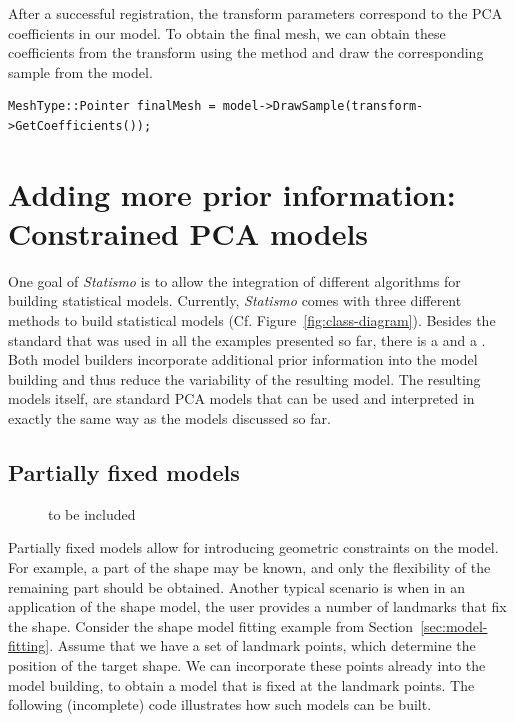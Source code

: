 \documentclass{InsightArticle}
\newcommand{\Statismo}{\emph{Statismo}\xspace}
\begin{document}
After a successful registration, the transform parameters correspond to the PCA coefficients in our model. 
To obtain the final mesh, we can obtain these coefficients from the transform using the method  
and draw the corresponding sample from the model. 
\begin{verbatim}
MeshType::Pointer finalMesh = model->DrawSample(transform->GetCoefficients());
\end{verbatim}


\section{Adding more prior information: Constrained PCA models }
One goal of \Statismo is to allow the integration of  different algorithms for building statistical models.
Currently, \Statismo comes with three different methods to build statistical models (Cf. Figure~\ref{fig:class-diagram}). Besides the standard  that was used in all the examples presented so far, there is a  \cite{luthi_probabilistic_2009} and a  \cite{blanc_conditional_2009}. Both model builders incorporate additional prior information into the model building and thus reduce the variability of the resulting model. The resulting models itself, are standard PCA models that can be used and interpreted in exactly the same way as the models discussed so far. 
\subsection{Partially fixed models}
\begin{figure}
  to be included
    \label{fig:constrained-model}
\end{figure}
Partially fixed models allow for introducing geometric constraints on the model. For example, a part of the shape may be known, and only the flexibility of the remaining part should be obtained. Another typical scenario is when in an application of the shape model, the user provides a number of landmarks that fix the shape. 
Consider the shape model fitting example from Section~\ref{sec:model-fitting}. Assume that we have a set of landmark points, which determine the position of the target shape. We can incorporate these points already into the model building, to obtain a model that is fixed at the landmark points. 
The following (incomplete) code illustrates how such models can be built. 
\end{document}
